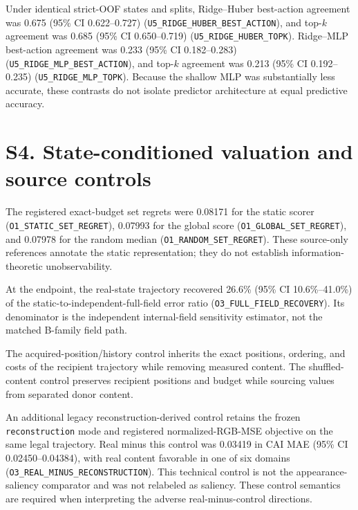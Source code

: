 \documentclass[11pt]{article}
\begin{document}
Under identical strict-OOF states and splits, Ridge--Huber best-action agreement
was 0.675 (95\% CI 0.622--0.727)
(\texttt{U5\_RIDGE\_HUBER\_BEST\_ACTION}), and top-$k$ agreement was 0.685
(95\% CI 0.650--0.719) (\texttt{U5\_RIDGE\_HUBER\_TOPK}). Ridge--MLP
best-action agreement was 0.233 (95\% CI 0.182--0.283)
(\texttt{U5\_RIDGE\_MLP\_BEST\_ACTION}), and top-$k$ agreement was 0.213
(95\% CI 0.192--0.235) (\texttt{U5\_RIDGE\_MLP\_TOPK}). Because the shallow
MLP was substantially less accurate, these contrasts do not isolate predictor
architecture at equal predictive accuracy.

\section{S4. State-conditioned valuation and source controls}

The registered exact-budget set regrets were 0.08171 for the static scorer
(\texttt{O1\_STATIC\_SET\_REGRET}), 0.07993 for the global score
(\texttt{O1\_GLOBAL\_SET\_REGRET}), and 0.07978 for the random median
(\texttt{O1\_RANDOM\_SET\_REGRET}). These source-only references annotate the
static representation; they do not establish information-theoretic
unobservability.

At the endpoint, the real-state trajectory recovered 26.6\% (95\% CI
10.6\%--41.0\%) of the static-to-independent-full-field error ratio
(\texttt{O3\_FULL\_FIELD\_RECOVERY}). Its denominator is the independent
internal-field sensitivity estimator, not the matched B-family field path.

The acquired-position/history control inherits the exact positions, ordering,
and costs of the recipient trajectory while removing measured content. The
shuffled-content control preserves recipient positions and budget while
sourcing values from separated donor content.

An additional legacy reconstruction-derived control retains the frozen
\texttt{reconstruction} mode and registered normalized-RGB-MSE objective on the
same legal trajectory. Real minus this control was 0.03419 in CAI MAE (95\% CI
0.02450--0.04384), with real content favorable in one of six domains
(\texttt{O3\_REAL\_MINUS\_RECONSTRUCTION}). This technical control is not the
appearance-saliency comparator and was not relabeled as saliency. These control
semantics are required when interpreting the adverse real-minus-control
directions.
\end{document}
